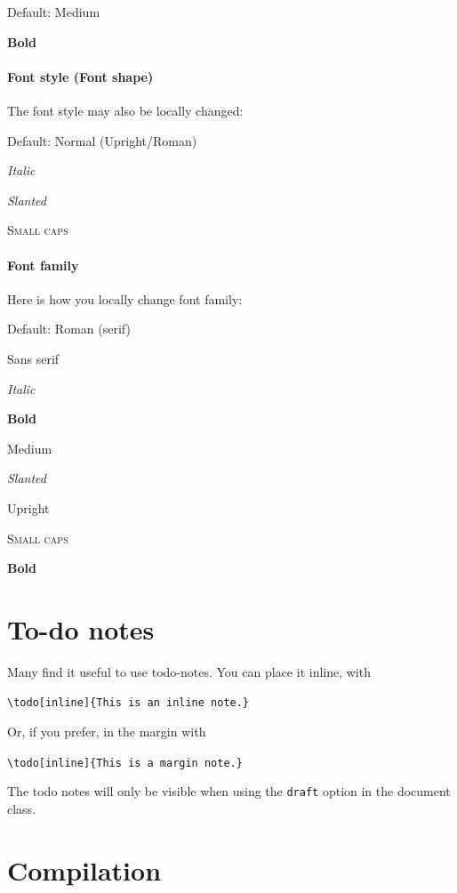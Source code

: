     \textmd{Default: Medium}
    
    \textbf{Bold}
    
    
\paragraph{Font style (Font shape)}
The font style may also be locally changed:
    
    \textup{Default: Normal (Upright/Roman)}
    
    \textit{Italic}
    
    \textsl{Slanted}
    
    \textsc{Small caps}
    
\paragraph{Font family}
Here is how you locally change font family:
 \begin{compactitem}
  \item \textrm{Default: Roman (serif)}
  \item \textsf{Sans serif}
  \item \textit{Italic}
  \item \textbf{Bold}
  \item \textmd{Medium}
  \item \textsl{Slanted}
  \item \textup{Upright}
  \item \textsc{Small caps}
  \item \textbf{Bold}
 \end{compactitem}   
    
    
\section{To-do notes}
\label{sec:miscellaneous}

Many find it useful to use todo-notes. You can place it inline, with

\verb|\todo[inline]{This is an inline note.}|

Or, if you prefer, in the margin with 

\verb|\todo[inline]{This is a margin note.}|

 The todo notes will only be visible when using the \texttt{draft} option in the document class.

\section{Compilation}


